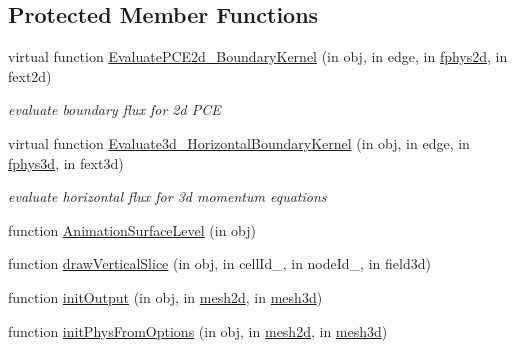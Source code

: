 \subsection*{Protected Member Functions}
\begin{DoxyCompactItemize}
\item 
virtual function \hyperlink{class_l_s_w_e3d_a56d1c65890b1d410e210821d6f76a1e2}{Evaluate\+P\+C\+E2d\+\_\+\+Boundary\+Kernel} (in obj, in edge, in \hyperlink{class_l_s_w_e3d_a041b98e0bcf7540ae293b75181698e7f}{fphys2d}, in fext2d)
\begin{DoxyCompactList}\small\item\em evaluate boundary flux for 2d P\+CE \end{DoxyCompactList}\item 
virtual function \hyperlink{class_l_s_w_e3d_a36b18f24588676b6ce058722c034e320}{Evaluate3d\+\_\+\+Horizontal\+Boundary\+Kernel} (in obj, in edge, in \hyperlink{class_l_s_w_e3d_a0de3e11488a76f7735c2381d48ac66d9}{fphys3d}, in fext3d)
\begin{DoxyCompactList}\small\item\em evaluate horizontal flux for 3d momentum equations \end{DoxyCompactList}\item 
function \hyperlink{class_l_s_w_e3d_a1bd0a98aca82cb732473e28192041ee9}{Animation\+Surface\+Level} (in obj)
\item 
function \hyperlink{class_l_s_w_e3d_a6bd636ddbb25c548dfc6c3af697bbfda}{draw\+Vertical\+Slice} (in obj, in cell\+Id\+\_, in node\+Id\+\_, in field3d)
\item 
function \hyperlink{class_l_s_w_e3d_aa3e46dfa17950ffb83df76a8ce1b5f34}{init\+Output} (in obj, in \hyperlink{class_l_s_w_e3d_abb000bf296c2d3b922ab524c93cc2b3f}{mesh2d}, in \hyperlink{class_l_s_w_e3d_ab2a8fc06f55e023a64c987c456a5127b}{mesh3d})
\item 
function \hyperlink{class_l_s_w_e3d_a90182eb8946aa5c60cc31cc142ac3eef}{init\+Phys\+From\+Options} (in obj, in \hyperlink{class_l_s_w_e3d_abb000bf296c2d3b922ab524c93cc2b3f}{mesh2d}, in \hyperlink{class_l_s_w_e3d_ab2a8fc06f55e023a64c987c456a5127b}{mesh3d})
\end{DoxyCompactItemize}
